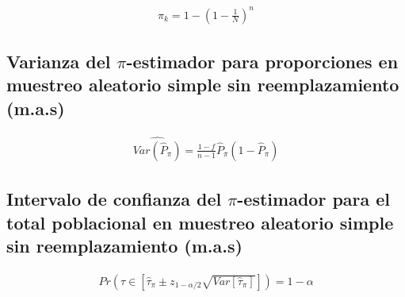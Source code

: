 \documentclass{article}
\begin{document}
      \begin{align}
        \pi_k = 1 - \left(1 - \frac{1}{N}\right)^n
      \end{align}

    \subsection{Varianza del $\pi$-estimador para proporciones en muestreo aleatorio simple sin reemplazamiento (m.a.s)}


      \begin{align}
        \widehat{Var(\widehat{P}_\pi)} = \frac{1-f}{n-1}\widehat{P}_\pi(1-\widehat{P}_\pi)
      \end{align}

    \subsection{Intervalo de confianza del $\pi$-estimador para el total poblacional en muestreo aleatorio simple sin reemplazamiento (m.a.s)}

      \begin{align}
        Pr\left(\tau \in \left[\widehat{\tau}_\pi \pm z_{1-\alpha/2}\sqrt{Var[\widehat{\tau}_\pi]}\right]\right) = 1-\alpha
      \end{align}
	\nocite{muest2017}

  
  
\end{document}

